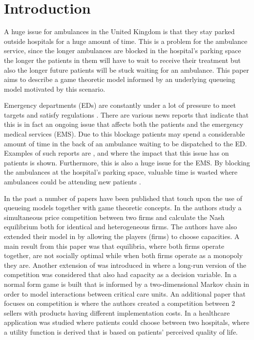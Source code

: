 \section{Introduction}

A huge issue for ambulances in the United Kingdom is that they stay 
parked outside hospitals for a huge amount of time. 
This is a problem for the ambulance service, since the longer ambulances are
blocked in the hospital's parking space the longer the patients in them will
have to wait to receive their treatment but also the longer future patients 
will be stuck waiting for an ambulance.
This paper aims to describe a game theoretic model informed by an underlying 
queueing model motivated by this scenario.

Emergency departments (EDs) are constantly under a lot of pressure to meet 
targets and satisfy regulations \cite{EmergencyDepartmentWinterPressures}.
There are various news reports that indicate that this is in fact an ongoing 
issue that affects both the patients and the emergency medical services (EMS).
Due to this blockage patients may spend a considerable amount of time in the 
back of an ambulance waiting to be dispatched to the ED.
Examples of such reports are \cite{mirror}, \cite{thenews} and \cite{bmj} where
the impact that this issue has on patients is shown. 
Furthermore, this is also a huge issue for the EMS.
By blocking the ambulances at the hospital's parking space, valuable time is 
wasted where ambulances could be attending new patients \cite{eastanglia}.

In the past a number of papers have been published that touch upon the use of 
queueing models together with game theoretic concepts.
In \cite{FirmCompetition} the authors study a simultaneous price competition 
between two firms and calculate the Nash equilibrium both for identical and 
heterogeneous firms. 
The authors have also extended their model in \cite{FirmCompetition2} by 
allowing the players (firms) to choose capacities. 
A main result from this paper was that equilibria, where both firms operate
together, are not socially optimal while when both firms operate as a monopoly 
they are.
Another extension of \cite{FirmCompetition} was introduced in 
\cite{FirmCompetitionExtension} where a long-run version of the competition was 
considered that also had capacity as a decision variable.
In \cite{knight2017measuring} a normal form game is built that is informed by a 
two-dimensional Markov chain in order to model interactions between critical
care units.
An additional paper that focuses on competition is \cite{fan2009short} where
the authors created a competition between 2 sellers with products having 
different implementation costs.
In \cite{sadat2015can} a healthcare application was studied where patients 
could choose between two hospitals, where a utility function is derived that is
based on patients' perceived quality of life.

